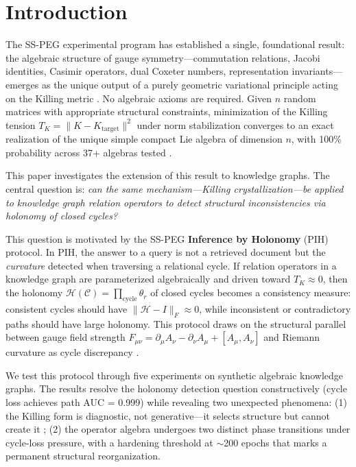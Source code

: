 \documentclass[11pt,letterpaper]{article}
\newcommand{\KH}{\mathcal{H}}
\newcommand{\KC}{\mathcal{C}}
\begin{document}
\section{Introduction}

The SS-PEG experimental program has established a single, foundational result: the algebraic structure of gauge symmetry---commutation relations, Jacobi identities, Casimir operators, dual Coxeter numbers, representation invariants---emerges as the unique output of a purely geometric variational principle acting on the Killing metric \cite{sspeg_synthesis2026, tsubouchi2021, bump2005}. No algebraic axioms are required. Given $n$ random matrices with appropriate structural constraints, minimization of the Killing tension $T_K = \|K - K_{\text{target}}\|^2$ under norm stabilization converges to an exact realization of the unique simple compact Lie algebra of dimension $n$, with 100\% probability across 37+ algebras tested \cite{sspeg_synthesis2026, hall2003, knapp2002}.

This paper investigates the extension of this result to knowledge graphs. The central question is: \textit{can the same mechanism---Killing crystallization---be applied to knowledge graph relation operators to detect structural inconsistencies via holonomy of closed cycles?}

This question is motivated by the SS-PEG \textbf{Inference by Holonomy} (PIH) protocol. In PIH, the answer to a query is not a retrieved document but the \textit{curvature} detected when traversing a relational cycle. If relation operators in a knowledge graph are parameterized algebraically and driven toward $T_K \approx 0$, then the holonomy $\KH(\KC) = \prod_{\text{cycle}} \theta_r$ of closed cycles becomes a consistency measure: consistent cycles should have $\|\KH - I\|_F \approx 0$, while inconsistent or contradictory paths should have large holonomy. This protocol draws on the structural parallel between gauge field strength $F_{\mu\nu} = \partial_\mu A_\nu - \partial_\nu A_\mu + [A_\mu, A_\nu]$ and Riemann curvature as cycle discrepancy \cite{yang1954, jacobson1995, aharonov1959, berry1984}.

We test this protocol through five experiments on synthetic algebraic knowledge graphs. The results resolve the holonomy detection question constructively (cycle loss achieves path AUC = 0.999) while revealing two unexpected phenomena: (1) the Killing form is diagnostic, not generative---it selects structure but cannot create it \cite{tsubouchi2021, carr2024}; (2) the operator algebra undergoes two distinct phase transitions under cycle-loss pressure, with a hardening threshold at $\sim$200 epochs that marks a permanent structural reorganization.
\end{document}
